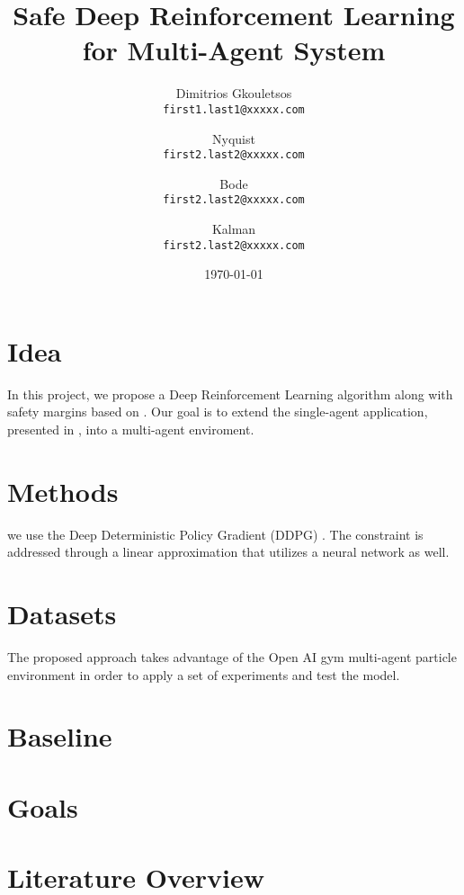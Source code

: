 \documentclass[12pt,oneside]{article}
\title{\Huge\textbf{Safe Deep Reinforcement Learning for Multi-Agent System }}
\author{
  Dimitrios Gkouletsos\\
  \texttt{first1.last1@xxxxx.com}
  \and
  Nyquist\\
  \texttt{first2.last2@xxxxx.com}
  \and
  Bode\\
  \texttt{first2.last2@xxxxx.com}
  \and
  Kalman\\
  \texttt{first2.last2@xxxxx.com}
}
\date{\today}
\begin{document}
\maketitle

\section{Idea}
In this project, we propose a Deep Reinforcement Learning algorithm along with safety margins based on \cite{SafeExploration}. Our goal is to extend the 
single-agent application, presented in \cite{SafeExploration}, into a multi-agent enviroment. 

\section{Methods}
we use the Deep Deterministic Policy Gradient (DDPG) \cite{DDPG}. 
The constraint is addressed through a linear approximation that utilizes a neural network as well. 

\section{Datasets}
The proposed approach takes advantage of the Open AI gym multi-agent particle environment \cite{environment} in order to apply a set of experiments and 
test the model. 
\section{Baseline}

\section{Goals}

\section{Literature Overview}


\end{document}
